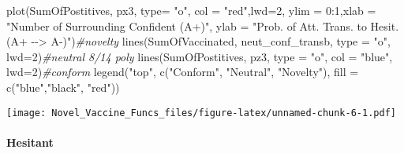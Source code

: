 \documentclass[
]{article}
\newenvironment{Shaded}{\begin{snugshade}}{\end{snugshade}}
\newcommand{\AttributeTok}[1]{\textcolor[rgb]{0.77,0.63,0.00}{#1}}
\newcommand{\CommentTok}[1]{\textcolor[rgb]{0.56,0.35,0.01}{\textit{#1}}}
\newcommand{\DecValTok}[1]{\textcolor[rgb]{0.00,0.00,0.81}{#1}}
\newcommand{\FunctionTok}[1]{\textcolor[rgb]{0.00,0.00,0.00}{#1}}
\newcommand{\NormalTok}[1]{#1}
\newcommand{\SpecialCharTok}[1]{\textcolor[rgb]{0.00,0.00,0.00}{#1}}
\newcommand{\StringTok}[1]{\textcolor[rgb]{0.31,0.60,0.02}{#1}}
\begin{document}
\begin{Shaded}
\begin{Highlighting}[]
\FunctionTok{plot}\NormalTok{(SumOfPostitives, px3, }\AttributeTok{type=} \StringTok{"o"}\NormalTok{, }\AttributeTok{col =} \StringTok{"red"}\NormalTok{,}\AttributeTok{lwd=}\DecValTok{2}\NormalTok{, }\AttributeTok{ylim =} \DecValTok{0}\SpecialCharTok{:}\DecValTok{1}\NormalTok{,}\AttributeTok{xlab =} \StringTok{"Number of Surrounding Confident (A+)"}\NormalTok{, }\AttributeTok{ylab =} \StringTok{"Prob. of Att. Trans. to Hesit. (A+ {-}{-}\textgreater{} A{-})"}\NormalTok{)}\CommentTok{\#novelty}
\FunctionTok{lines}\NormalTok{(SumOfVaccinated, neut\_conf\_transb, }\AttributeTok{type =} \StringTok{"o"}\NormalTok{, }\AttributeTok{lwd=}\DecValTok{2}\NormalTok{)}\CommentTok{\#neutral 8/14 poly}
\FunctionTok{lines}\NormalTok{(SumOfPostitives, pz3, }\AttributeTok{type =} \StringTok{"o"}\NormalTok{, }\AttributeTok{col =} \StringTok{"blue"}\NormalTok{, }\AttributeTok{lwd=}\DecValTok{2}\NormalTok{)}\CommentTok{\#conform}
\FunctionTok{legend}\NormalTok{(}\StringTok{"top"}\NormalTok{, }\FunctionTok{c}\NormalTok{(}\StringTok{"Conform"}\NormalTok{, }\StringTok{"Neutral"}\NormalTok{, }\StringTok{"Novelty"}\NormalTok{), }\AttributeTok{fill =} \FunctionTok{c}\NormalTok{(}\StringTok{"blue"}\NormalTok{,}\StringTok{"black"}\NormalTok{, }\StringTok{"red"}\NormalTok{))}
\end{Highlighting}
\end{Shaded}

\texttt{[image: Novel\_Vaccine\_Funcs\_files/figure-latex/unnamed-chunk-6-1.pdf]}

\hypertarget{hesitant}{%
\paragraph{Hesitant}\label{hesitant}}
\end{document}
